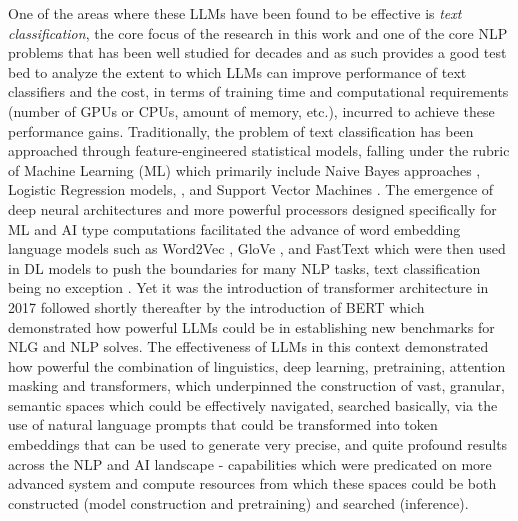 \documentclass[final]{clv2025-revised}
\begin{document}
One of the areas where these LLMs have been found to be effective is \textit{text classification}, the core focus of the research in this work and one of the core NLP problems that has been well studied for decades and as such provides a good test bed to analyze the extent to which LLMs can improve performance of text classifiers and the cost, in terms of training time and computational requirements (number of GPUs or CPUs, amount of memory, etc.), incurred to achieve these performance gains. Traditionally, the problem of text classification has been approached through feature-engineered statistical models, falling under the rubric of Machine Learning (ML) which primarily include Naive Bayes approaches \cite{mccallum1998comparison}, Logistic Regression models, \cite{genkin01082007}, and Support Vector Machines \cite{joachims1998text}. The emergence of deep neural architectures and more powerful processors designed specifically for ML and AI type computations facilitated the advance of word embedding language models such as Word2Vec \cite{mikolov}, GloVe \cite{pennington}, and FastText \cite{articleboja} which were then used in DL models to push the boundaries for many NLP tasks, text classification being no exception \cite{zhang2015character} \cite{yoon2014convolutional} \cite{hochreiterlong}. Yet it was the introduction of transformer architecture in 2017 \cite{vaswani} followed shortly thereafter by the introduction of BERT \cite{devlin-etal-2019-bert} which demonstrated how powerful LLMs could be in establishing new benchmarks for NLG and NLP solves. The effectiveness of LLMs in this context demonstrated how powerful the combination of linguistics, deep learning, pretraining, attention masking and transformers, which underpinned the construction of vast, granular, semantic spaces which could be effectively navigated, searched basically, via the use of natural language prompts that could be transformed into token embeddings that can be used to generate very precise, and quite profound results across the NLP and AI landscape - capabilities which were predicated on  more advanced system and compute resources from which these spaces could be both constructed (model construction and pretraining) and searched (inference). 
\end{document}
